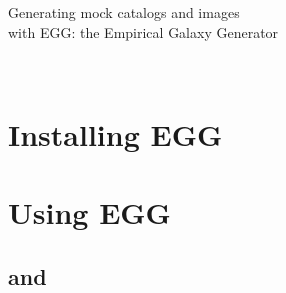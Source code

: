 \documentclass[12pt,a4paper]{article}
\newcommand{\egg}{\textsc{EGG}\xspace}
\begin{document}
\sloppy

\begin{center}
{\huge Generating mock catalogs and images \\[0.1cm] with \egg:} {\Large the Empirical Galaxy Generator}
\end{center}
~\\

\tableofcontents

\section{Installing \egg}



\section{Using \egg}



\subsection{}



\subsection{}



\subsection{ and }


\end{document}
